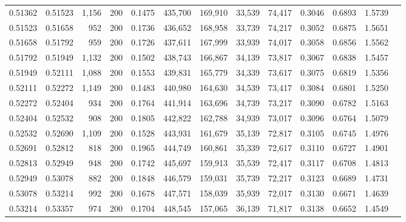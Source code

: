 \begin{tabular}{rrrrrrrrrrrrr}
0.51362 & 0.51523 &  1,156 & 200 &                                     0.1475 & 435,700 & 169,910 &  33,539 &  74,417 & 0.3046 & 0.6893 & 1.5739 \\
0.51523 & 0.51658 &    952 & 200 &                                     0.1736 & 436,652 & 168,958 &  33,739 &  74,217 & 0.3052 & 0.6875 & 1.5651 \\
0.51658 & 0.51792 &    959 & 200 &                                     0.1726 & 437,611 & 167,999 &  33,939 &  74,017 & 0.3058 & 0.6856 & 1.5562 \\
0.51792 & 0.51949 &  1,132 & 200 &                                     0.1502 & 438,743 & 166,867 &  34,139 &  73,817 & 0.3067 & 0.6838 & 1.5457 \\
0.51949 & 0.52111 &  1,088 & 200 &                                     0.1553 & 439,831 & 165,779 &  34,339 &  73,617 & 0.3075 & 0.6819 & 1.5356 \\
0.52111 & 0.52272 &  1,149 & 200 &                                     0.1483 & 440,980 & 164,630 &  34,539 &  73,417 & 0.3084 & 0.6801 & 1.5250 \\
0.52272 & 0.52404 &    934 & 200 &                                     0.1764 & 441,914 & 163,696 &  34,739 &  73,217 & 0.3090 & 0.6782 & 1.5163 \\
0.52404 & 0.52532 &    908 & 200 &                                     0.1805 & 442,822 & 162,788 &  34,939 &  73,017 & 0.3096 & 0.6764 & 1.5079 \\
0.52532 & 0.52690 &  1,109 & 200 &                                     0.1528 & 443,931 & 161,679 &  35,139 &  72,817 & 0.3105 & 0.6745 & 1.4976 \\
0.52691 & 0.52812 &    818 & 200 &                                     0.1965 & 444,749 & 160,861 &  35,339 &  72,617 & 0.3110 & 0.6727 & 1.4901 \\
0.52813 & 0.52949 &    948 & 200 &                                     0.1742 & 445,697 & 159,913 &  35,539 &  72,417 & 0.3117 & 0.6708 & 1.4813 \\
0.52949 & 0.53078 &    882 & 200 &                                     0.1848 & 446,579 & 159,031 &  35,739 &  72,217 & 0.3123 & 0.6689 & 1.4731 \\
0.53078 & 0.53214 &    992 & 200 &                                     0.1678 & 447,571 & 158,039 &  35,939 &  72,017 & 0.3130 & 0.6671 & 1.4639 \\
0.53214 & 0.53357 &    974 & 200 &                                     0.1704 & 448,545 & 157,065 &  36,139 &  71,817 & 0.3138 & 0.6652 & 1.4549 \\

\end{tabular}
